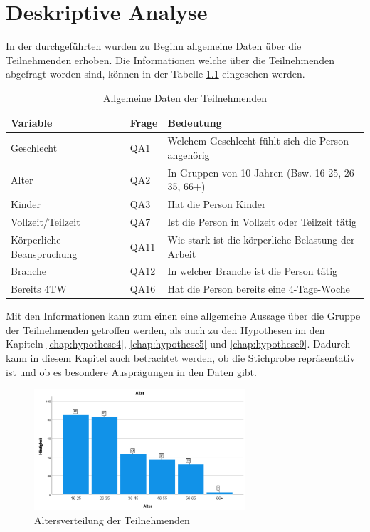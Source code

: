 \chapter{Deskriptive Analyse}

In der durchgeführten wurden zu Beginn allgemeine Daten über die Teilnehmenden erhoben.
Die Informationen welche über die Teilnehmenden abgefragt worden sind, können in der Tabelle
\ref{tab:allgemeine_daten} eingesehen werden.

\begin{table}[h]
    \centering
    \begin{tabular}{|l|l|p{8cm}|}
        \hline
        \textbf{Variable} & \textbf{Frage} & \textbf{Bedeutung}\\
        \hline
        Geschlecht & QA1 & Welchem Geschlecht fühlt sich die Person angehörig\\\hline
        Alter & QA2 & In Gruppen von 10 Jahren (Bsw. 16-25, 26-35, 66+)\\\hline
        Kinder & QA3 & Hat die Person Kinder\\\hline
        Vollzeit/Teilzeit & QA7 & Ist die Person in Vollzeit oder Teilzeit tätig\\\hline
        Körperliche Beanspruchung & QA11 & Wie stark ist die körperliche Belastung der Arbeit\\\hline
        Branche & QA12 & In welcher Branche ist die Person tätig\\\hline
        Bereits 4TW & QA16 & Hat die Person bereits eine 4-Tage-Woche\\\hline
        \hline
    \end{tabular}
    \caption{Allgemeine Daten der Teilnehmenden}
    \label{tab:allgemeine_daten}
\end{table}

Mit den Informationen kann zum einen eine allgemeine Aussage über die Gruppe der Teilnehmenden 
getroffen werden, als auch zu den Hypothesen im den Kapiteln \ref{chap:hypothese4},
\ref{chap:hypothese5} und \ref{chap:hypothese9}. Dadurch kann in diesem Kapitel auch betrachtet
werden, ob die Stichprobe repräsentativ ist und ob es besondere Ausprägungen in den Daten gibt.

\begin{figure}[h]
    \centering
    \includegraphics[width=0.7\textwidth]{04_Artefakte/01_Abbildungen/deskriptiv_alter.png}
    \caption{Altersverteilung der Teilnehmenden}
    \label{fig:altersverteilung}
\end{figure}

